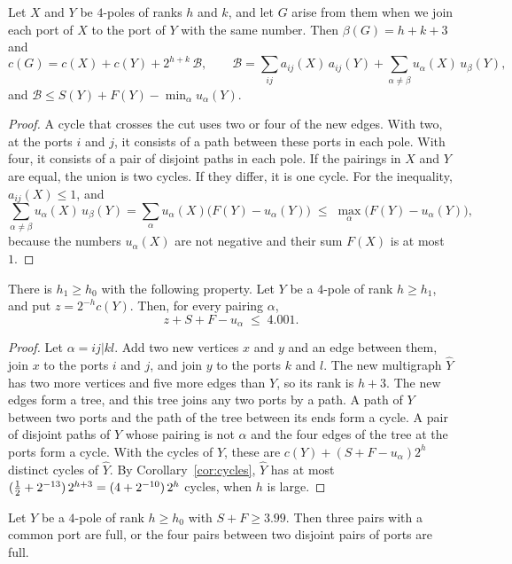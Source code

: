 \begin{lemma}[Gluing]\label{lem:glue4}
Let $X$ and $Y$ be $4$-poles of ranks $h$ and $k$, and let $G$ arise from them when we join each
port of $X$ to the port of $Y$ with the same number. Then $\beta(G)=h+k+3$ and
\[
  c(G)=c(X)+c(Y)+2^{h+k}\,\mathcal B,\qquad
  \mathcal B=\sum_{ij}a_{ij}(X)\,a_{ij}(Y)+\sum_{\alpha\ne\beta}u_\alpha(X)\,u_\beta(Y),
\]
and $\mathcal B\le S(Y)+F(Y)-\min_\alpha u_\alpha(Y)$.
\end{lemma}

\begin{proof}
A cycle that crosses the cut uses two or four of the new edges. With two, at the ports $i$ and $j$,
it consists of a path between these ports in each pole. With four, it consists of a pair of
disjoint paths in each pole. If the pairings in $X$ and $Y$ are equal, the union is two cycles. If
they differ, it is one cycle. For the inequality, $a_{ij}(X)\le1$, and
\[
  \sum_{\alpha\ne\beta}u_\alpha(X)\,u_\beta(Y)=\sum_\alpha u_\alpha(X)\bigl(F(Y)-u_\alpha(Y)\bigr)
  \;\le\;\max_\alpha\bigl(F(Y)-u_\alpha(Y)\bigr),
\]
because the numbers $u_\alpha(X)$ are not negative and their sum $F(X)$ is at most $1$.
\end{proof}

\begin{lemma}[Cap]\label{lem:cap}
There is $h_1\ge h_0$ with the following property. Let $Y$ be a $4$-pole of rank $h\ge h_1$, and
put $z=2^{-h}c(Y)$. Then, for every pairing $\alpha$,
\[
  z+S+F-u_\alpha\;\le\;4.001 .
\]
\end{lemma}

\begin{proof}
Let $\alpha=ij|kl$. Add two new vertices $x$ and $y$ and an edge between them, join $x$ to the
ports $i$ and $j$, and join $y$ to the ports $k$ and $l$. The new
multigraph $\hat Y$ has two more vertices and five more edges than $Y$, so its rank is $h+3$. The
new edges form a tree, and this tree joins any two ports by a path. A path of $Y$ between two
ports and the path of the tree between its ends form a cycle. A pair of disjoint paths of $Y$
whose pairing is not $\alpha$ and the four edges of the tree at the ports form a cycle. With the
cycles of $Y$, these are $c(Y)+(S+F-u_\alpha)2^{h}$ distinct cycles of $\hat Y$. By
Corollary~\ref{cor:cycles}, $\hat Y$ has at most $(\tfrac12+2^{-13})\,2^{h+3}=(4+2^{-10})\,2^{h}$
cycles, when $h$ is large.
\end{proof}

\begin{lemma}[Rigidity]\label{lem:rigid}
Let $Y$ be a $4$-pole of rank $h\ge h_0$ with $S+F\ge3.99$. Then three pairs with a common port
are full, or the four pairs between two disjoint pairs of ports are full.
\end{lemma}

